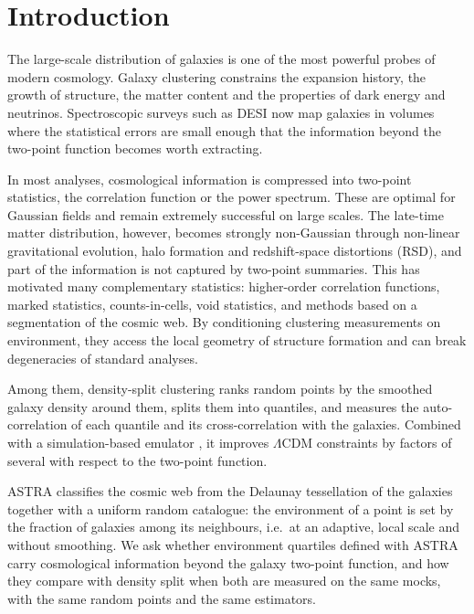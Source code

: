 \documentclass[11pt,twocolumn]{article}
\begin{document}
\section{Introduction}

The large-scale distribution of galaxies is one of the most powerful probes of modern cosmology. Galaxy clustering constrains the expansion history, the growth of structure, the matter content and the properties of dark energy and neutrinos. Spectroscopic surveys such as DESI now map galaxies in volumes where the statistical errors are small enough that the information beyond the two-point function becomes worth extracting.

In most analyses, cosmological information is compressed into two-point statistics, the correlation function or the power spectrum. These are optimal for Gaussian fields and remain extremely successful on large scales. The late-time matter distribution, however, becomes strongly non-Gaussian through non-linear gravitational evolution, halo formation and redshift-space distortions (RSD), and part of the information is not captured by two-point summaries. This has motivated many complementary statistics: higher-order correlation functions, marked statistics, counts-in-cells, void statistics, and methods based on a segmentation of the cosmic web. By conditioning clustering measurements on environment, they access the local geometry of structure formation and can break degeneracies of standard analyses.

Among them, density-split clustering \cite{Paillas2023, Paillas2024} ranks random points by the smoothed galaxy density around them, splits them into quantiles, and measures the auto-correlation of each quantile and its cross-correlation with the galaxies. Combined with a simulation-based emulator \cite{CuestaLazaro2024}, it improves $\Lambda$CDM constraints by factors of several with respect to the two-point function.

ASTRA \cite{ASTRA} classifies the cosmic web from the Delaunay tessellation of the galaxies together with a uniform random catalogue: the environment of a point is set by the fraction of galaxies among its neighbours, i.e.\ at an adaptive, local scale and without smoothing. We ask whether environment quartiles defined with ASTRA carry cosmological information beyond the galaxy two-point function, and how they compare with density split when both are measured on the same mocks, with the same random points and the same estimators.
\end{document}
